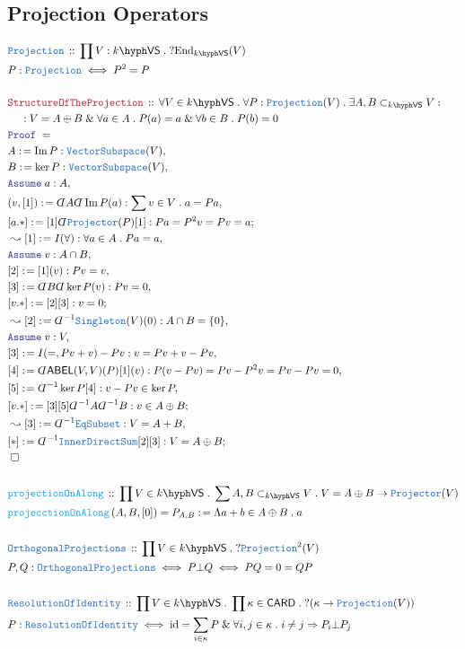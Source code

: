 \documentclass[12pt]{scrartcl}%
\newcommand{\TYPE}[1]{\textcolor{NavyBlue}{\mathtt{#1}}}%
\newcommand{\FUNC}[1]{\textcolor{Cerulean}{\mathtt{#1}}}%
\newcommand{\LOGIC}[1]{\textcolor{Blue}{\mathtt{#1}}}%
\newcommand{\THM}[1]{\textcolor{Maroon}{\mathtt{#1}}}%
\renewcommand{\.}{\; . \;} %
\newcommand{\de}{: \kern 0.1pc =} %
\newcommand{\Act}[1]{\left( #1 \right)} %
\newcommand{\Theorem}[2]{& \THM{#1} \, :: \, #2 \\ & \Proof = \\ } %
\newcommand{\DeclareType}[2]{& \TYPE{#1} \, :: \, #2 \\}%
\newcommand{\DefineType}[3]{& #1 : \TYPE{#2} \iff #3 \\}%
\newcommand{\DefineNamedType}[4]{& #1 : \TYPE{#2} \iff #3 \iff #4 \\}%
\newcommand{\DeclareFunc}[2]{& \FUNC{#1} \, :: \, #2 \\}%
\newcommand{\DefineNamedFunc}[4]{&  \FUNC{#1}\Act{#2} = #3 \de #4 \\}%
\newcommand{\NewLine}{\\ & \kern 1pc}%
\newcommand{\Page}[1]{ \begin{align*} #1 \end{align*}  }%
\newcommand{ \bd }{ \ByDef }%
\renewcommand{\And}{\; \& \;}%
\DeclareMathOperator*{\id}{id}%
\DeclareMathOperator*{\im}{Im}%
\newcommand{\End}{\mathrm{End}}%
\newcommand{\Say}[3]{& #1 \de #2 : #3, \\} %
\newcommand{\Conclude}[3]{& #1 \de #2 : #3; \\}%
\newcommand{\Derive}[3]{& \leadsto #1 \de #2 : #3, \\} %
\newcommand{\Assume}[2]{& \LOGIC{Assume} \; #1 : #2, \\} %
\newcommand{\QED}{\; \square} %
\newcommand{\EndProof}{& \QED \\} %
\newcommand{\ByDef}{\rotatebox[origin=c]{-180}{$D$}}%
\newcommand{\Proof}{\LOGIC{Proof} \; } %
\newcommand{\ABEL}{\mathsf{ABEL}} %
\newcommand{\subvec}[1]{\subset_{\VS{#1}}}%
\newcommand{\VS}[1]{#1\hyph\mathsf{VS}} %
\begin{document}
\subsection{Projection Operators}
\Page{
	\DeclareType{Projection}{\prod V : \VS{k} \. ?\End_{\VS{k}}(V)}
	\DefineType{P}{Projection}{P^2 = P}
	\\
	\Theorem{StructureOfTheProjection}{ 
		\forall V \in \VS{k} \. 
		\forall P : \TYPE{Projection}(V) \. 
		\exists A,B \subvec{k} V : \NewLine : 
			V = A \oplus B \And 
			\forall a \in A \. 
				P(a) = a  \And
			\forall b \in B \.
				P(b) = 0
	}
	\Say{A}{\im P}{\TYPE{VectorSubspace}(V)}
	\Say{B}{\ker P}{\TYPE{VectorSubspace}(V)}
	\Assume{a}{A}
	\Say{(v,[1])}{\bd A \bd \im P(a)}{\sum v \in V \. a = Pa}
	\Conclude{[a.*]}{[1]\bd\TYPE{Projector}(P)[1]}{Pa = P^2v = Pv = a }
	\Derive{[1]}{I(\forall)}{\forall a \in A \. Pa = a}
	\Assume{v}{A \cap B}
	\Say{[2]}{[1](v)}{Pv = v}
	\Say{[3]}{\bd B \bd \ker P (v)}{Pv = 0}
	\Conclude{[v.*]}{[2][3]}{v = 0}
	\Derive{[2]}{\bd^{-1}\TYPE{Singleton}(V)(0)}{A \cap B = \{0\}}
	\Assume{v}{V}
	\Say{[3]}{I(=, Pv + v) - Pv}{v = Pv + v - Pv}
	\Say{[4]}{ \bd \ABEL(V,V)(P)[1](v)}{P(v - Pv) = Pv - P^2v = Pv - Pv = 0}
	\Say{[5]}{\bd^{-1}\ker P[4]}{v - Pv \in \ker P}
	\Conclude{[v.*]}{[3][5]\bd^{-1}A\bd^{-1}B}{v \in A \oplus B}
	\Derive{[3]}{\bd^{-1} \TYPE{EqSubset}}{V = A + B}
	\Conclude{[*]}{\bd^{-1}\TYPE{InnerDirectSum}[2][3]}{V = A \oplus B}
	\EndProof
	\\
	\DeclareFunc{projectionOnAlong}{\prod V \in \VS{k} \. \sum A,B \subvec{k} {V} \. V = A \oplus B \to \TYPE{Projector}(V)}
	\DefineNamedFunc{projecctionOnAlong}{A,B,[0]}{P_{A,B}}{\Lambda a + b \in A \oplus B \. a}
	\\
	\DeclareType{OrthogonalProjections}{\prod V \in \VS{k} \. ?\TYPE{Projection}^2(V)}
	\DefineNamedType{P,Q}{OrthogonalProjections}{P \bot Q}{ PQ = 0 = QP}
	\\
	\DeclareType{ResolutionOfIdentity}{\prod V \in \VS{k} \. \prod \kappa \in \mathsf{CARD} \.  ?(\kappa \to \TYPE{Projection}(V))}
	\DefineType{P}{ResolutionOfIdentity}{ \id = \sum_{i \in \kappa} P \And \forall i,j \in \kappa \. i \neq j \Rightarrow P_i \bot P_j}
}
\end{document}
